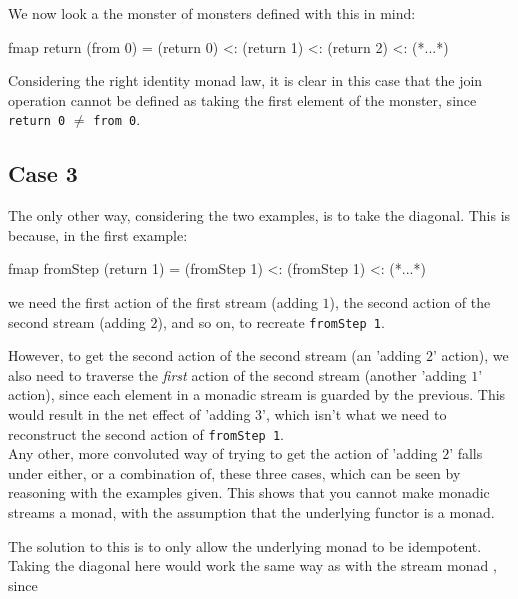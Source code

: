 We now look a the monster of monsters defined with this in mind:
\begin{haskell}
fmap return (from 0) = (return 0) <: (return 1) <: (return 2) <: (*...*)
\end{haskell}

Considering the right identity monad law, it is clear in this case that the join operation cannot be defined as taking the first element of the monster, since \verb+return 0+ $\neq$ \verb+from 0+.

\subsection{Case 3}

The only other way, considering the two examples, is to take the diagonal. This is because, in the first example:
\begin{haskell}
fmap fromStep (return 1) = (fromStep 1) <: (fromStep 1) <: (*...*)
\end{haskell}
we need the first action of the first stream (adding $1$), the second action of the second stream (adding $2$), and so on, to recreate  \verb+fromStep 1+.

However, to get the second action of the second stream (an 'adding $2$' action), we also need to traverse the \emph {first} action of the second stream (another 'adding $1$' action), since each element in a monadic stream is guarded by the previous. This would result in the net effect of 'adding $3$', which isn't what we need to reconstruct the second action of \verb+fromStep 1+. \\

Any other, more convoluted way of trying to get the action of 'adding $2$' falls under either, or a combination of, these three cases, which can be seen by reasoning with the examples given. This shows that you cannot make monadic streams a monad, with the assumption that the underlying functor is a monad.

The solution to this is to only allow the underlying monad to be idempotent. Taking the diagonal here would work the same way as with the stream monad \cite{}, since 


